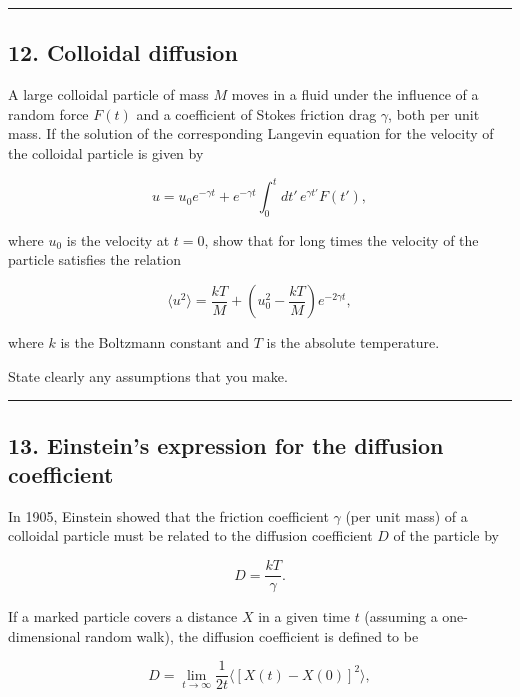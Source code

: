 \documentclass[
  letterpaper,
  enabledeprecatedfontcommands]{report}
\begin{document}
\begin{center}\rule{0.5\linewidth}{0.5pt}\end{center}

\subsection*{12. Colloidal diffusion}\label{colloidal-diffusion}

A large colloidal particle of mass \(M\) moves in a fluid under the
influence of a random force \(F(t)\) and a coefficient of Stokes
friction drag \(\gamma\), both per unit mass. If the solution of the
corresponding Langevin equation for the velocity of the colloidal
particle is given by

\[
u = u_0 e^{-\gamma t} + e^{-\gamma t} \int_0^t dt' \, e^{\gamma t'} F(t'),
\]

where \(u_0\) is the velocity at \(t = 0\), show that for long times the
velocity of the particle satisfies the relation

\[
\langle u^2 \rangle = \frac{kT}{M} + \left( u_0^2 - \frac{kT}{M} \right) e^{-2\gamma t},
\]

where \(k\) is the Boltzmann constant and \(T\) is the absolute
temperature.

State clearly any assumptions that you make.

\begin{center}\rule{0.5\linewidth}{0.5pt}\end{center}

\subsection*{13. Einstein's expression for the diffusion
coefficient}\label{einsteins-expression-for-the-diffusion-coefficient}

In 1905, Einstein showed that the friction coefficient \(\gamma\) (per
unit mass) of a colloidal particle must be related to the diffusion
coefficient \(D\) of the particle by

\[
D = \frac{kT}{\gamma}.
\]

If a marked particle covers a distance \(X\) in a given time \(t\)
(assuming a one-dimensional random walk), the diffusion coefficient is
defined to be

\[
D = \lim_{t \to \infty} \frac{1}{2t} \langle [X(t) - X(0)]^2 \rangle,
\]
\end{document}
